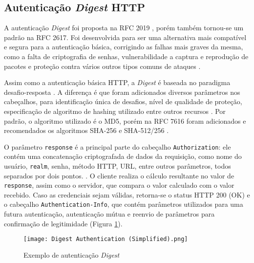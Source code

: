 \subsection{Autenticação \emph{Digest} HTTP}

A autenticação \emph{Digest} foi proposta na RFC 2019 \cite{RFC2019}, porém também tornou-se um 
padrão na RFC 2617. Foi desenvolvida para ser uma alternativa mais compatível e segura  para 
a autenticação básica, corrigindo as falhas mais graves da mesma, como a falta de criptografia de 
senhas, vulnerabilidade a captura e reprodução de pacotes e proteção contra vários outros tipos 
comuns de ataques \cite{GOURLEY2002}.

Assim como a autenticação básica HTTP, a \emph{Digest} é baseada no paradigma 
desafio-resposta \cite{RFC7616}. A diferença é que foram adicionados diversos parâmetros nos 
cabeçalhos, para identificação única de desafios, nível de qualidade de proteção, especificação de 
algoritmo de hashing utilizado entre outros recursos \cite{CHAPMAN2012}. Por padrão, o algoritmo 
utilizado é o MD5, porém na RFC 7616 foram adicionados e recomendados os algoritmos SHA-256 e 
SHA-512/256 \cite{RFC7616}.

O parâmetro \texttt{response} é a principal parte do cabeçalho \texttt{Authorization}: ele contém 
uma concatenação criptografada de dados da requisição, como nome do usuário, \texttt{realm}, senha, 
método HTTP, URL, entre outros parâmetros, todos separados por dois pontos. \cite{CHAPMAN2012}. O 
cliente realiza o cálculo resultante no valor de \texttt{response}, assim como o servidor, que 
compara o valor calculado com o valor recebido. Caso as credenciais sejam válidas, retorna-se o 
status HTTP 200 (OK) e o cabeçalho \texttt{Authentication-Info}, que contém parâmetros utilizados 
para uma futura autenticação, autenticação mútua e reenvio de parâmetros para confirmação de 
legitimidade (Figura \ref{fig:digestAuth}).

\begin{figure}[ht]
  \centering
  \texttt{[image: Digest Authentication (Simplified).png]}
  \caption{Exemplo de autenticação \emph{Digest}}
  \label{fig:digestAuth}
\end{figure}